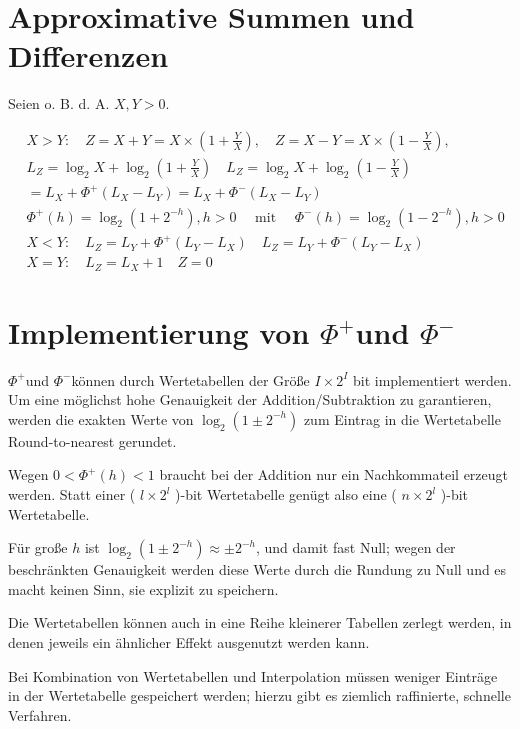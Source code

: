 \documentclass[10pt]{article}
\begin{document}
\section*{Approximative Summen und Differenzen}
Seien o. B. d. A. $X, Y>0$.

$$
\begin{aligned}
& X>Y: \quad Z=X+Y=X \times\left(1+\frac{Y}{X}\right), \quad Z=X-Y=X \times\left(1-\frac{Y}{X}\right), \\
& L_{Z}=\log _{2} X+\log _{2}\left(1+\frac{Y}{X}\right) \quad L_{Z}=\log _{2} X+\log _{2}\left(1-\frac{Y}{X}\right) \\
& =L_{X}+\Phi^{+}\left(L_{X}-L_{Y}\right)=L_{X}+\Phi^{-}\left(L_{X}-L_{Y}\right) \\
& \Phi^{+}(h)=\log _{2}\left(1+2^{-h}\right), h>0 \quad \text { mit } \quad \Phi^{-}(h)=\log _{2}\left(1-2^{-h}\right), h>0 \\
& X<Y: \quad L_{Z}=L_{Y}+\Phi^{+}\left(L_{Y}-L_{X}\right) \quad L_{Z}=L_{Y}+\Phi^{-}\left(L_{Y}-L_{X}\right) \\
& X=Y: \quad L_{Z}=L_{X}+1 \quad Z=0
\end{aligned}
$$

\section*{Implementierung von $\Phi^{+}$und $\Phi^{-}$}
$\Phi^{+}$und $\Phi^{-}$können durch Wertetabellen der Größe $I \times 2^{I}$ bit implementiert werden.\\
Um eine möglichst hohe Genauigkeit der Addition/Subtraktion zu garantieren, werden die exakten Werte von $\log _{2}\left(1 \pm 2^{-h}\right)$ zum Eintrag in die Wertetabelle Round-to-nearest gerundet.

Wegen $0<\Phi^{+}(h)<1$ braucht bei der Addition nur ein Nachkommateil erzeugt werden. Statt einer ( $l \times 2^{l}$ )-bit Wertetabelle genügt also eine ( $n \times 2^{l}$ )-bit Wertetabelle.

Für große $h$ ist $\log _{2}\left(1 \pm 2^{-h}\right) \approx \pm 2^{-h}$, und damit fast Null; wegen der beschränkten Genauigkeit werden diese Werte durch die Rundung zu Null und es macht keinen Sinn, sie explizit zu speichern.

Die Wertetabellen können auch in eine Reihe kleinerer Tabellen zerlegt werden, in denen jeweils ein ähnlicher Effekt ausgenutzt werden kann.

Bei Kombination von Wertetabellen und Interpolation müssen weniger Einträge in der Wertetabelle gespeichert werden; hierzu gibt es ziemlich raffinierte, schnelle Verfahren.
\end{document}
